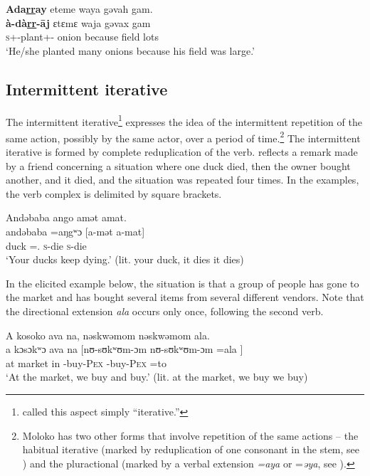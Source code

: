 \ea\label{ex:7:89}
\textbf{Ada\underline{rr}ay}  eteme  waya  gəvah  gam.\\
\gll  \textbf{à-dà\underline{rr}{}-\={a}j}    ɛtɛmɛ  waja  gəvax  gam\\
      \textsc{s}+{\PFV}-plant+{\ITR}-{\CL}  onion  because  field  lots\\
\glt  ‘He/she planted many onions because his field was large.’\\
\z
{}
\subsection{Intermittent iterative}\label{sec:7.4.5}
\hypertarget{RefHeading1212301525720847}{}
The intermittent iterative\footnote{\citet{FriesenMamalis2008} called this aspect simply “iterative.”} expresses the idea of the intermittent repetition of the same action, possibly by the same actor, over a period of time.\footnote{Moloko has two other forms that involve repetition of the same actions -- the habitual iterative (marked by reduplication of one consonant in the stem, see ) and the pluractional (marked by a verbal extension\textit{ =aya }or =\textit{əya}, see ).}  The intermittent iterative is formed by complete reduplication of the verb.  reflects a remark made by a friend concerning a situation where one duck died, then the owner bought another, and it died, and the situation was repeated four times.  In the examples, the verb complex is delimited by square brackets. 

\ea\label{ex:7:90} 
Andəbaba  ango  amət  amat.\\
\gll andəbaba =aŋgʷɔ [a-mət a-mat]\\
     duck  ={\twoS}.{\POSS}  \textsc{s}-die   \textsc{s}-die \\
\glt ‘Your ducks keep dying.’ (lit. your duck, it dies it dies)
\z

In the elicited example below, the situation is that a group of people has gone to the market and has bought several items from several different vendors. Note that the directional extension \textit{ala} occurs only once, following the second verb.

\ea\label{ex:7:91}
A  kosoko  ava  na,  nəskwəmom  nəskwəmom  ala.\\
\gll  a  kɔsɔkʷɔ  ava  na  [nʊ-sʊkʷʊm-ɔm   nʊ-sʊkʷʊm-ɔm =ala ]\\
      at  market  in  {\PSP}  -buy-\textsc{Pex}  -buy-\textsc{Pex}   =to\\
\glt  ‘At the market, we buy and buy.’ (lit. at the market, we buy we buy)\\
\z 
{}
